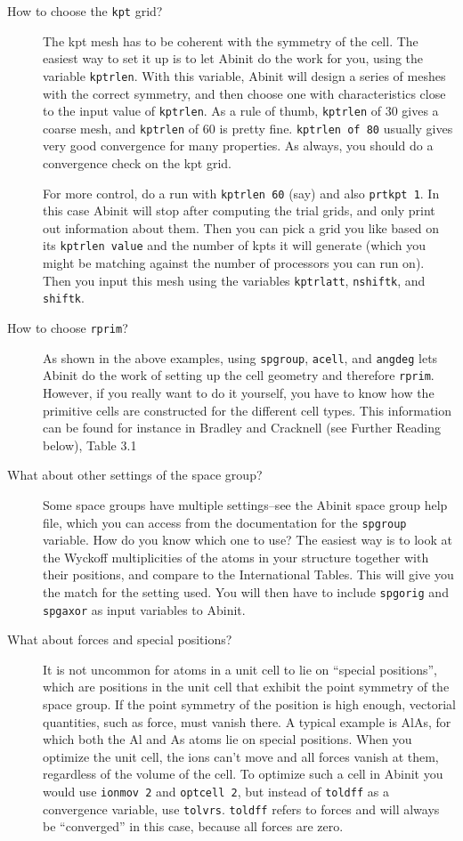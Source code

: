 \documentclass{article}
\begin{document}
\begin{description}

\item[How to choose the {\tt kpt} grid?] The kpt mesh has to be coherent with the symmetry of the cell. 
The easiest way to set it up is to let {\sc Abinit} do the work for you, using the variable {\tt kptrlen}. 
With this variable, {\sc Abinit} will design a series of meshes with the correct symmetry, and then choose
one with characteristics close to the input value of {\tt kptrlen}. As a rule of thumb, {\tt kptrlen} of 30 gives
a coarse mesh, and {\tt kptrlen} of 60 is pretty fine. {\tt kptrlen of 80} usually gives very good convergence for
many properties. As always, you should do a convergence check on the kpt grid. 

For more control, do a run with {\tt kptrlen 60} (say) and also {\tt prtkpt 1}. In this case {\sc Abinit} will stop
after computing the trial grids, and only print out information about them. Then you can pick a grid you like
based on its {\tt kptrlen value} and the number of kpts it will generate (which you might be matching against the
number of processors you can run on). Then you input this mesh using the variables {\tt kptrlatt}, {\tt nshiftk},
and {\tt shiftk}. 

\item[How to choose {\tt rprim}?]
As shown in the above examples, using {\tt spgroup}, {\tt acell}, and {\tt angdeg} lets {\sc Abinit} do the work of
setting up the cell geometry and therefore {\tt rprim}. However, if you really want to do it yourself, you have to know 
how the primitive cells are constructed for the different cell types. This information can be found for instance in Bradley
and Cracknell (see Further Reading below), Table 3.1

\item[What about other settings of the space group?]
Some space groups have multiple settings--see the {\sc Abinit} space group help file, which you can access from the
documentation for the {\tt spgroup} variable. How do you know which one to use? The easiest way is to look at the
Wyckoff multiplicities of the atoms in your structure together with their positions, and compare to the 
International Tables. This will give you the match for the setting used. You will then have to include {\tt spgorig}
and {\tt spgaxor} as input variables to {\sc Abinit}.

\item[What about forces and special positions?]It is not uncommon for atoms in a unit cell to lie on ``special positions'', which
are positions in the unit cell that exhibit the point symmetry of the space group. If the point symmetry of the position is
high enough, vectorial quantities, such as force, must vanish there. A typical example is AlAs, for which both the Al and As
atoms lie on special positions. When you optimize the unit cell, the ions can't move and all forces vanish at them, regardless
of the volume of the cell. To optimize such a cell in {\sc Abinit} you would use {\tt ionmov 2} and {\tt optcell 2}, but instead
of {\tt toldff} as a convergence variable, use {\tt tolvrs}. {\tt toldff} refers to forces and will always be ``converged'' in this
case, because all forces are zero.


\end{description}
\end{document}
